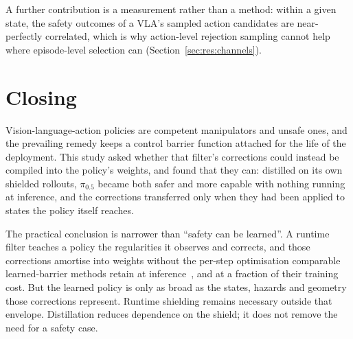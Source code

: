 A further contribution is a measurement rather than a method: within a given state, the safety
outcomes of a VLA's sampled action candidates are near-perfectly correlated, which is why
action-level rejection sampling cannot help where episode-level selection can
(Section~\ref{sec:res:channels}).

\section{Closing}\label{sec:conc:closing}

Vision-language-action policies are competent manipulators and unsafe ones, and the prevailing
remedy keeps a control barrier function attached for the life of the deployment. This study asked
whether that filter's corrections could instead be compiled into the policy's weights, and found
that they can: distilled on its own shielded rollouts, $\pi_{0.5}$ became both safer and more
capable with nothing running at inference, and the corrections transferred only when they had been
applied to states the policy itself reaches.

The practical conclusion is narrower than ``safety can be learned''. A runtime filter teaches a
policy the regularities it observes and corrects, and those corrections amortise into weights
without the per-step optimisation comparable learned-barrier methods retain at
inference~\cite{meng2024conbat,sun2025lpb}, and at a fraction of their training cost. But the
learned policy is only as broad as the states, hazards and geometry those corrections represent.
Runtime shielding remains necessary outside that envelope. Distillation reduces dependence on the
shield; it does not remove the need for a safety case.
